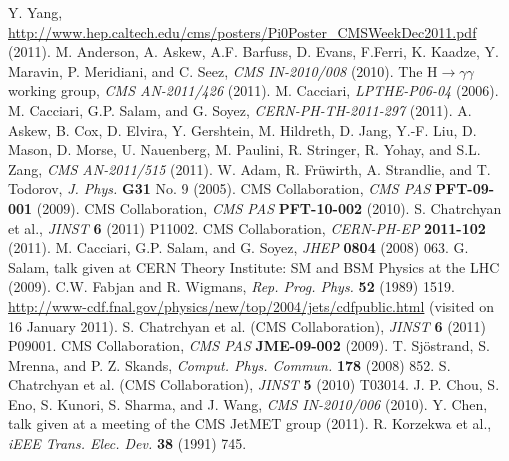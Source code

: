 \documentclass[12pt, letterpaper]{report}
\begin{document}
\begin{thebibliography}{99}
 Y. Yang, \url{http://www.hep.caltech.edu/cms/posters/Pi0Poster_CMSWeekDec2011.pdf} (2011).
 M. Anderson, A. Askew, A.F. Barfuss, D. Evans, F.Ferri, K. Kaadze, Y. 
Maravin, P. Meridiani, and C. Seez, \textit{CMS IN-2010/008} (2010).
 The H$\rightarrow\gamma\gamma$ working group, \textit{CMS AN-2011/426} (2011).
 M. Cacciari, \textit{LPTHE-P06-04} (2006).
 M. Cacciari, G.P. Salam, and G. Soyez, \textit{CERN-PH-TH-2011-297} (2011).
 A. Askew, B. Cox, D. Elvira, Y. Gershtein, M. Hildreth, D. Jang, Y.-F. Liu, D. Mason, D. Morse, U. Nauenberg, M. Paulini, R. Stringer, R. Yohay, and S.L. Zang, \textit{CMS AN-2011/515} (2011).
 W. Adam, R. Fr\"uwirth, A. Strandlie, and T. Todorov, \textit{J. Phys.} \textbf{G31} No. 9 (2005).
 CMS Collaboration, \textit{CMS PAS} \textbf{PFT-09-001} (2009).
 CMS Collaboration, \textit{CMS PAS} \textbf{PFT-10-002} (2010).
 S. Chatrchyan et al., \textit{JINST} \textbf{6} (2011) P11002.
 CMS Collaboration, \textit{CERN-PH-EP} \textbf{2011-102} (2011).
 M. Cacciari, G.P. Salam, and G. Soyez, \textit{JHEP} \textbf{0804} (2008) 063.
 G. Salam, talk given at CERN Theory Institute: SM and BSM Physics at the LHC (2009).
 C.W. Fabjan and R. Wigmans, \textit{Rep. Prog. Phys.} \textbf{52} (1989) 1519.
 \url{http://www-cdf.fnal.gov/physics/new/top/2004/jets/cdfpublic.html} (visited on 16 January 2011).
 S. Chatrchyan et al. (CMS Collaboration), \textit{JINST} \textbf{6} (2011) P09001.
 CMS Collaboration, \textit{CMS PAS} \textbf{JME-09-002} (2009).
 T. Sj\"ostrand, S. Mrenna, and P. Z. Skands, \textit{Comput. Phys. Commun.} \textbf{178} (2008) 852.
 S. Chatrchyan et al. (CMS Collaboration), \textit{JINST} \textbf{5} (2010) T03014.
 J. P. Chou, S. Eno, S. Kunori, S. Sharma, and J. Wang, \textit{CMS IN-2010/006} (2010).
 Y. Chen, talk given at a meeting of the CMS JetMET group (2011).
 R. Korzekwa et al., \textit{iEEE Trans. Elec. Dev.} \textbf{38} (1991) 745.

\end{thebibliography}
\end{document}
